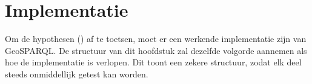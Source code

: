 \chapter{Implementatie}
\label{chap:implementatie}
Om de hypothesen () af te toetsen, moet er een werkende implementatie zijn van GeoSPARQL. De structuur van dit hoofdstuk zal dezelfde volgorde aannemen als hoe de implementatie is verlopen. Dit toont een zekere structuur, zodat elk deel steeds onmiddellijk getest kan worden. 


 
\newpage
 
\newpage
 
\newpage
 
\newpage
 
\newpage
 
\newpage
 
\newpage